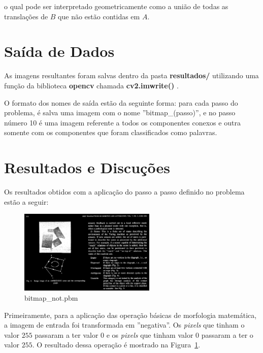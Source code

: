 \documentclass[twoside,twocolumn]{article}
\begin{document}
o qual pode ser interpretado geometricamente como a união de todas as translações de $B$ que não estão contidas em $A$.


\section{Saída de Dados}

As imagens resultantes foram salvas dentro da pasta \textbf{resultados/} utilizando uma função da biblioteca \textbf{opencv} chamada \textbf{cv2.imwrite()} \cite{b1}.

O formato dos nomes de saída estão da seguinte forma: para cada passo do problema, é salva uma imagem com o nome ''bitmap\_(passo)'', e no passo número 10 é uma imagem referente a todos os componentes conexos e outra somente com os componentes que foram classificados como palavras.


\section{Resultados e Discuções}

Os resultados obtidos com a aplicação do passo a passo definido no problema estão a seguir:

\begin{figure}[H]
\begin{center}
	\includegraphics[height=4cm]{figures/bitmap_not.png}
\caption{bitmap\_not.pbm} \label{bitmap_not}
\end{center}
\end{figure}

Primeiramente, para a aplicação das operação básicas de morfologia matemática, a imagem de entrada foi transformada em ''negativa''. Os \textit{pixels} que tinham o valor $255$ passaram a ter valor $0$ e os \textit{pixels} que tinham valor $0$ passaram a ter o valor $255$. O resultado dessa operação é mostrado na Figura~\ref{bitmap_not}.
\end{document}
